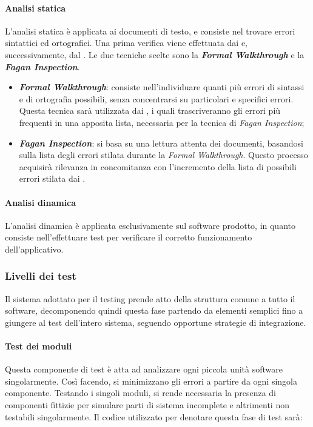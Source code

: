 			\paragraph{Analisi statica}
			L'analisi statica è applicata ai documenti di testo, e consiste nel trovare errori sintattici ed ortografici. Una prima verifica viene effettuata dai \textit{\Vers} e, successivamente, dal \textit{\RdP}. Le due tecniche scelte sono la \textbf{\textit{Formal Walkthrough}} e la \textbf{\textit{Fagan Inspection}}.
			\begin{itemize}
				\item \textbf{\textit{Formal Walkthrough}}: consiste nell'individuare quanti più errori di sintassi e di ortografia possibili, senza concentrarsi su particolari e specifici errori. Questa tecnica sarà utilizzata dai \textit{\Vers}, i quali trascriveranno gli errori più frequenti in una apposita lista, necessaria per la tecnica di \textit{Fagan Inspection};
				\item \textbf{\textit{Fagan Inspection}}: si basa su una lettura attenta dei documenti, basandosi sulla lista degli errori stilata durante la \textit{Formal Walkthrough}. Questo processo acquisirà rilevanza in concomitanza con l'incremento della lista di possibili errori stilata dai \textit{\Vers}.
			\end{itemize}

			\paragraph{Analisi dinamica}
			L'analisi dinamica è applicata esclusivamente sul software prodotto, in quanto consiste nell’effettuare test per verificare il corretto funzionamento dell’applicativo.
	
			
		\subsubsection{Livelli dei test}
		Il sistema adottato per il testing prende atto della struttura comune a tutto il software, decomponendo quindi questa fase partendo da elementi semplici fino a giungere al test dell'intero sistema, seguendo opportune strategie di integrazione.
		
		\paragraph{Test dei moduli}
		Questa componente di test è atta ad analizzare ogni piccola unità software singolarmente. Così facendo, si minimizzano gli errori a partire da ogni singola componente. Testando i singoli moduli, si rende necessaria la presenza di componenti fittizie per simulare parti di sistema incomplete e altrimenti non testabili singolarmente. Il codice utilizzato per denotare questa fase di test sarà:
		
